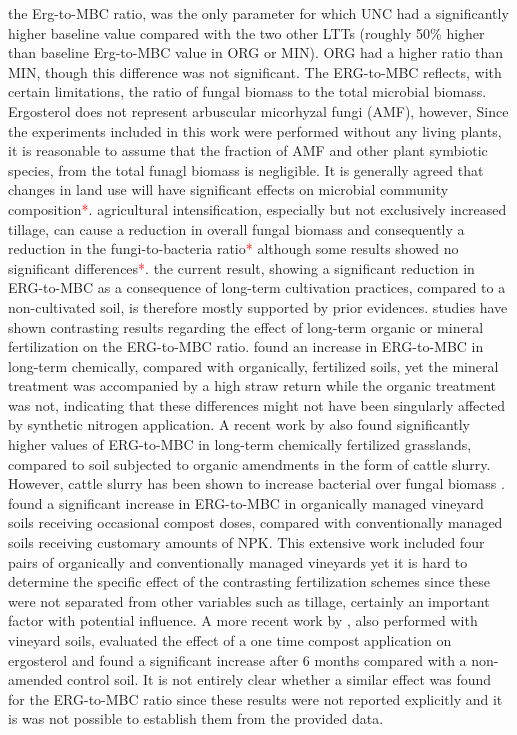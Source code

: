 \documentclass[12pt]{report}
\newcommand{\myRed}[1]{\textcolor{red}{#1}} %
\begin{document}
the Erg-to-MBC ratio, was the only parameter for which UNC had a significantly higher baseline value compared with the two other LTTs (roughly 50\% higher than baseline Erg-to-MBC value in ORG or MIN).   
ORG had a higher ratio than MIN, though this difference was not significant. The ERG-to-MBC reflects, with certain limitations, the ratio of fungal biomass to the total microbial biomass. Ergosterol does not represent arbuscular micorhyzal fungi (AMF), however, Since the experiments included in this work were performed without any living plants, it is reasonable to assume that the fraction of AMF and other plant symbiotic species, from the total funagl biomass is negligible. 
It is generally agreed that changes in land use will have significant effects on microbial community composition\myRed{*}. agricultural intensification, especially but not exclusively increased tillage, can cause a reduction in overall fungal biomass and consequently a reduction in the fungi-to-bacteria ratio\myRed{*} although some results showed no significant differences\myRed{*}. 
the current result, showing a significant reduction in ERG-to-MBC as a consequence of long-term cultivation practices, compared to a non-cultivated soil, is therefore mostly supported by prior evidences.
studies have shown contrasting results regarding the effect of long-term organic or mineral fertilization on the ERG-to-MBC ratio. \citet{heinze2010} found an increase in ERG-to-MBC in long-term chemically, compared with organically, fertilized soils, yet the mineral treatment was accompanied by a high straw return while the organic treatment was not, indicating that these differences might not have been  singularly affected by synthetic nitrogen application. A recent work by \citet{knoblauch2017} also found significantly higher values of ERG-to-MBC in long-term chemically fertilized grasslands, compared to soil subjected to organic amendments in the form of cattle slurry. However, cattle slurry has been shown to increase bacterial over fungal biomass \citet{knoblauch2017}.
\citet{probst2008} found a significant increase in ERG-to-MBC in organically managed vineyard soils receiving occasional compost doses, compared with conventionally managed soils receiving customary amounts of NPK. This extensive work included four pairs of organically and conventionally managed vineyards yet it is hard to determine the specific effect of the contrasting fertilization schemes since these were not separated from other variables such as tillage, certainly an important factor with potential influence. A more recent work by \citet{mackie2015} , also performed with vineyard soils, evaluated the effect of a one time compost application on ergosterol and found a significant increase after 6 months compared with a non-amended control soil. It is not entirely clear whether a similar effect was found for the ERG-to-MBC ratio since these results were not reported explicitly and it is was not possible to establish them from the provided data. 
\end{document}
